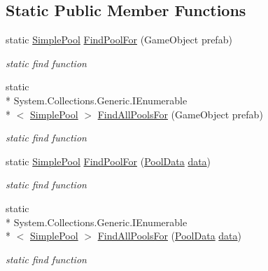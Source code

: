 \subsection*{Static Public Member Functions}
\begin{DoxyCompactItemize}
\item 
static \hyperlink{class_darkhexxa_1_1_simple_pool_1_1_simple_pool}{Simple\-Pool} \hyperlink{class_darkhexxa_1_1_simple_pool_1_1_simple_pool_a160f842c9441fb80243a9813492e7d08}{Find\-Pool\-For} (Game\-Object prefab)
\begin{DoxyCompactList}\small\item\em static find function \end{DoxyCompactList}\item 
static \\*
System.\-Collections.\-Generic.\-I\-Enumerable\\*
$<$ \hyperlink{class_darkhexxa_1_1_simple_pool_1_1_simple_pool}{Simple\-Pool} $>$ \hyperlink{class_darkhexxa_1_1_simple_pool_1_1_simple_pool_a40a74364e51c2eedf108b8a375f22709}{Find\-All\-Pools\-For} (Game\-Object prefab)
\begin{DoxyCompactList}\small\item\em static find function \end{DoxyCompactList}\item 
static \hyperlink{class_darkhexxa_1_1_simple_pool_1_1_simple_pool}{Simple\-Pool} \hyperlink{class_darkhexxa_1_1_simple_pool_1_1_simple_pool_afbfdaaf049c575ddae1aa1343ddc08a5}{Find\-Pool\-For} (\hyperlink{class_darkhexxa_1_1_simple_pool_1_1_simple_pool_1_1_pool_data}{Pool\-Data} \hyperlink{class_darkhexxa_1_1_simple_pool_1_1_simple_pool_ae49843e11db3e9491d166dba366c3fdf}{data})
\begin{DoxyCompactList}\small\item\em static find function \end{DoxyCompactList}\item 
static \\*
System.\-Collections.\-Generic.\-I\-Enumerable\\*
$<$ \hyperlink{class_darkhexxa_1_1_simple_pool_1_1_simple_pool}{Simple\-Pool} $>$ \hyperlink{class_darkhexxa_1_1_simple_pool_1_1_simple_pool_ab29a9b60515daff5ac4ca620546e5fc9}{Find\-All\-Pools\-For} (\hyperlink{class_darkhexxa_1_1_simple_pool_1_1_simple_pool_1_1_pool_data}{Pool\-Data} \hyperlink{class_darkhexxa_1_1_simple_pool_1_1_simple_pool_ae49843e11db3e9491d166dba366c3fdf}{data})
\begin{DoxyCompactList}\small\item\em static find function \end{DoxyCompactList}\item 

\end{DoxyCompactItemize}
